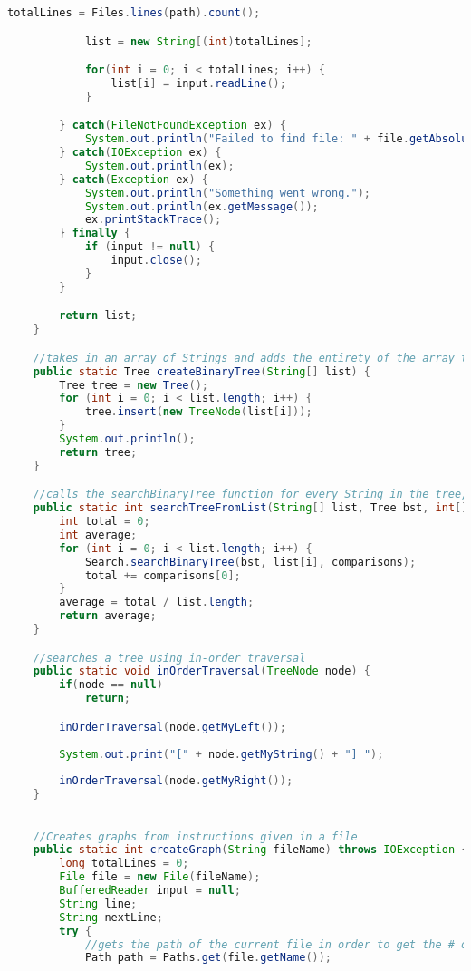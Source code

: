 \documentclass[letterpaper, 10pt,DIV=13]{scrartcl}
\numberwithin{equation}{section} %
\numberwithin{figure}{section} %
\numberwithin{table}{section} %
\begin{document}
\begin{lstlisting}[frame=single, language=java, breaklines]
            totalLines = Files.lines(path).count();

            list = new String[(int)totalLines];

            for(int i = 0; i < totalLines; i++) {
                list[i] = input.readLine();
            }

        } catch(FileNotFoundException ex) {
            System.out.println("Failed to find file: " + file.getAbsolutePath());
        } catch(IOException ex) {
            System.out.println(ex);
        } catch(Exception ex) {
            System.out.println("Something went wrong.");
            System.out.println(ex.getMessage());
            ex.printStackTrace();
        } finally {
            if (input != null) {
                input.close();
            }
        }

        return list;
    }

    //takes in an array of Strings and adds the entirety of the array to a Tree, before returning that Tree object.
    public static Tree createBinaryTree(String[] list) {
        Tree tree = new Tree();
        for (int i = 0; i < list.length; i++) {
            tree.insert(new TreeNode(list[i]));
        }
        System.out.println();
        return tree;
    }

    //calls the searchBinaryTree function for every String in the tree, then computes the average and returns it.
    public static int searchTreeFromList(String[] list, Tree bst, int[] comparisons) {
        int total = 0;
        int average;
        for (int i = 0; i < list.length; i++) {
            Search.searchBinaryTree(bst, list[i], comparisons);
            total += comparisons[0];
        }
        average = total / list.length;
        return average;
    }

    //searches a tree using in-order traversal
    public static void inOrderTraversal(TreeNode node) {
        if(node == null)
            return;

        inOrderTraversal(node.getMyLeft());
        
        System.out.print("[" + node.getMyString() + "] ");
        
        inOrderTraversal(node.getMyRight());
    }
    

    //Creates graphs from instructions given in a file
    public static int createGraph(String fileName) throws IOException {
        long totalLines = 0;
        File file = new File(fileName);
        BufferedReader input = null;
        String line;
        String nextLine;
        try {
            //gets the path of the current file in order to get the # of lines
            Path path = Paths.get(file.getName());


\end{lstlisting}
\end{document}
